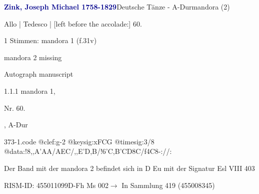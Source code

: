 \documentclass[twocolumn, 12pt]{book}
\begin{document}
\par \vspace{16pt} \textcolor{darkblue}{\textbf{Zink, Joseph Michael  1758-1829}}\hfillplus{\textbf{[373]}}\newline Deutsche Tänze - A-Dur\newline mandora (2)
\par \begin{itshape}[f.31v, at left:] Allo | Tedesco | [left before the accolade:] 60.\end{itshape} 
\par \textcolor{darkblue}{}  1 Stimmen: mandora 1  (f.31v)\newline \begin{small} mandora 2 missing\end{small} \newline Autograph manuscript
\par 1.1.1  mandora 1, \begin{itshape}Nr. 60.\end{itshape}, A-Dur  
\begin{filecontents*}{373-1.code}
@clef:g-2
@keysig:xFCG
@timesig:3/8
@data:!8,,A'AA/AEC/,,E'D,B/!{6'C,B'CD8C}/f4C8-://:
\end{filecontents*}
\newline %
\par Der Band mit der mandora 2 befindet sich in D Eu mit der Signatur Esl VIII 403
\par RISM-ID: 455011099\newline D-Fh  Ms 002\newline $\rightarrow$ In Sammlung 419 (455008345)
      
\end{document}
